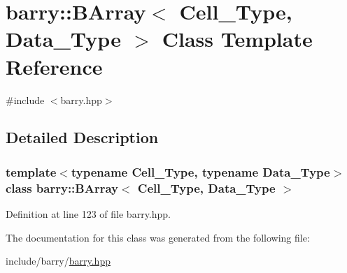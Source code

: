 \hypertarget{classbarry_1_1_b_array}{}\section{barry\+:\+:B\+Array$<$ Cell\+\_\+\+Type, Data\+\_\+\+Type $>$ Class Template Reference}
\label{classbarry_1_1_b_array}


{\ttfamily \#include $<$barry.\+hpp$>$}



\subsection{Detailed Description}
\subsubsection*{template$<$typename Cell\+\_\+\+Type, typename Data\+\_\+\+Type$>$\newline
class barry\+::\+B\+Array$<$ Cell\+\_\+\+Type, Data\+\_\+\+Type $>$}



Definition at line 123 of file barry.\+hpp.



The documentation for this class was generated from the following file\+:\begin{DoxyCompactItemize}
\item 
include/barry/\hyperlink{barry_8hpp}{barry.\+hpp}\end{DoxyCompactItemize}
